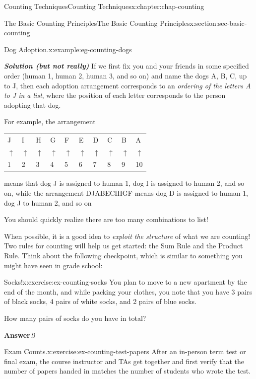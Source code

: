 \documentclass[oneside,10pt,]{book}
\newcommand{\blocktitlefont}{\relax}
\newcommand{\tabularfont}{\relax}
\newcommand{\alert}[1]{\textbf{\textit{#1}}}
\numberwithin{equation}{section}
\begin{document}
\begin{chapterptx}{Counting Techniques}{}{Counting Techniques}{}{}{x:chapter:chap-counting}
\begin{sectionptx}{The Basic Counting Principles}{}{The Basic Counting Principles}{}{}{x:section:sec-basic-counting}
\begin{example}{Dog Adoption.}{x:example:eg-counting-dogs}
\par
\alert{Solution (but not really)} If we first fix you and your friends in some specified order (human 1, human 2, human 3, and so on) and name the dogs A, B, C, up to J, then each adoption arrangement corresponds to an \emph{ordering of the letters A to J in a list}, where the position of each letter corresponds to the person adopting that dog.%
\par
For example, the arrangement%
\begin{sidebyside}{1}{0.1}{0.1}{0}%
\begin{sbspanel}{0.8}%
{\centering%
{\tabularfont%
\begin{tabular}{llllllllll}
J&I&H&G&F&E&D&C&B&A\tabularnewline[0pt]
\(\uparrow\)&\(\uparrow\)&\(\uparrow\)&\(\uparrow\)&\(\uparrow\)&\(\uparrow\)&\(\uparrow\)&\(\uparrow\)&\(\uparrow\)&\(\uparrow\)\tabularnewline[0pt]
1&2&3&4&5&6&7&8&9&10
\end{tabular}
}%
\par}
\end{sbspanel}%
\end{sidebyside}%
\par
means that dog J is assigned to human 1, dog I is assigned to human 2, and so on, while the arrangement DJABECIHGF means dog D is assigned to human 1, dog J to human 2, and so on\textellipsis{}%
\par
You should quickly realize there are too many combinations to list!%
\end{example}
When possible, it is a good idea to \emph{exploit the structure} of what we are counting! Two rules for counting will help us get started: the Sum Rule and the Product Rule. Think about the following checkpoint, which is similar to something you might have seen in grade school:%
\begin{inlineexercise}{Socks!}{x:exercise:ex-counting-socks}%
You plan to move to a new apartment by the end of the month, and while packing your clothes, you note that you have 3 pairs of black socks, 4 pairs of white socks, and 2 pairs of blue socks.%
\par
How many pairs of socks do you have in total?%
\par\smallskip%
\noindent\textbf{\blocktitlefont Answer}.\hypertarget{g:answer:id247464}{}\quad{}9%
\end{inlineexercise}
\begin{inlineexercise}{Exam Counts.}{x:exercise:ex-counting-test-papers}%
After an in-person term test or final exam, the course instructor and TAs get together and first verify that the number of papers handed in matches the number of students who wrote the test.%

\end{inlineexercise}
\end{sectionptx}
\end{chapterptx}
\end{document}
